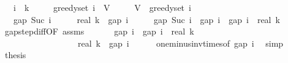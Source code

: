\begin{isabellebody}
\ \ \ {\isachardoublequoteopen}i\ {\isacharless}{\kern0pt}\ k{\isachardoublequoteclose}\isanewline
\ \ \ \ \ {\isachardoublequoteopen}greedy{\isacharunderscore}{\kern0pt}set\ i\ {\isasymsubseteq}\ V{\isachardoublequoteclose}\isanewline
\ \ \ \ \ {\isachardoublequoteopen}V\ {\isacharminus}{\kern0pt}\ greedy{\isacharunderscore}{\kern0pt}set\ i\ {\isasymnoteq}\ {\isacharbraceleft}{\kern0pt}{\isacharbraceright}{\kern0pt}{\isachardoublequoteclose}\isanewline
\ \ \ {\isachardoublequoteopen}gap\ {\isacharparenleft}{\kern0pt}Suc\ i{\isacharparenright}{\kern0pt}\ {\isasymle}\ {\isacharparenleft}{\kern0pt}{}\ {\isacharminus}{\kern0pt}\ {}\ {\isacharslash}{\kern0pt}\ real\ k{\isacharparenright}{\kern0pt}\ {\isacharasterisk}{\kern0pt}\ gap\ i{\isachardoublequoteclose}\isanewline
%
\isadelimproof
%
\endisadelimproof
%
\isatagproof
{}\isamarkupfalse%
\ {\isacharminus}{\kern0pt}\isanewline
\ \ \isamarkupfalse%
\ {\isachardoublequoteopen}gap\ {\isacharparenleft}{\kern0pt}Suc\ i{\isacharparenright}{\kern0pt}\ {\isasymle}\ gap\ i\ {\isacharminus}{\kern0pt}\ gap\ i\ {\isacharslash}{\kern0pt}\ real\ k{\isachardoublequoteclose}\isanewline
\ \ \ \ \isamarkupfalse%
\ gap{\isacharunderscore}{\kern0pt}step{\isacharunderscore}{\kern0pt}diff{\isacharbrackleft}{\kern0pt}OF\ assms{\isacharbrackright}{\kern0pt}\ \isakeywordONE{{\isachardot}{\kern0pt}}\isamarkupfalse%
\isanewline
\ \ \isamarkupfalse%
\ \isamarkupfalse%
\ {\isachardoublequoteopen}gap\ i\ {\isacharminus}{\kern0pt}\ gap\ i\ {\isacharslash}{\kern0pt}\ real\ k\isanewline
\ \ \ \ \ \ \ \ \ \ \ \ \ {\isacharequal}{\kern0pt}\ {\isacharparenleft}{\kern0pt}{}\ {\isacharminus}{\kern0pt}\ {}\ {\isacharslash}{\kern0pt}\ real\ k{\isacharparenright}{\kern0pt}\ {\isacharasterisk}{\kern0pt}\ gap\ i{\isachardoublequoteclose}\isanewline
\ \ \ \ \isamarkupfalse%
\ one{\isacharunderscore}{\kern0pt}minus{\isacharunderscore}{\kern0pt}inv{\isacharunderscore}{\kern0pt}times{\isacharbrackleft}{\kern0pt}of\ {\isachardoublequoteopen}gap\ i{\isachardoublequoteclose}{\isacharbrackright}{\kern0pt}\ \isamarkupfalse%
\ simp\isanewline
\ \ \isamarkupfalse%
\ \isamarkupfalse%
\ {\isacharquery}{\kern0pt}thesis\ \isakeywordONE{{\isachardot}{\kern0pt}}\isamarkupfalse%
\isanewline
{}\isamarkupfalse%
%
\endisatagproof
{\isafoldproof}%

\end{isabellebody}
